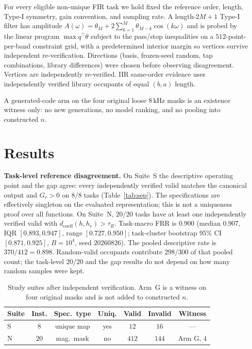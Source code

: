 \documentclass{article}
\begin{document}
For every eligible non-unique FIR task we hold fixed the reference
order, length, Type-I symmetry, gain convention, and sampling rate.
A length-$2M+1$ Type-I filter has amplitude
$A(\omega)=\theta_M+2\sum_{k=1}^{M}\theta_{M-k}\cos(k\omega)$
and is probed by the linear program
$\max q^\top\theta$ subject to the pass/stop inequalities on a
$512$-point-per-band constraint grid, with a predetermined interior
margin so vertices survive independent re-verification.
Directions (basis, frozen-seed random, tap combinations, library
differences) were chosen before observing disagreement.
Vertices are independently re-verified.
IIR same-order evidence uses independently verified library
occupants of equal $(b,a)$ length.

A generated-code arm on the four original loose $8\,\mathrm{kHz}$
masks is an existence witness only: no new generations, no model
ranking, and no pooling into constructed $n$.

\section{Results}
\label{sec:results}

\noindent\textbf{Task-level reference disagreement.}
On Suite~S the descriptive operating point and the gap agree: every
independently verified valid matches the canonical output and
$G_r>0$ on $8/8$ tasks (Table~\ref{tab:sep}).
The specifications are effectively singleton on the evaluated
representation; this is not a uniqueness proof over all functions.
On Suite~N, $20/20$ tasks have at least one independently verified
valid with $d_{\mathrm{coeff}}(h,h_r)>\tau_R$.
Task-macro FRR is $0.900$ (median $0.907$, IQR $[0.893,0.947]$,
range $[0.727,0.950]$; task-cluster bootstrap $95\%$ CI
$[0.871,0.925]$, $B=10^4$, seed $20260826$).
The pooled descriptive rate is $370/412=0.898$.
Random-valid occupants contribute $298/300$ of that pooled count;
the task-level $20/20$ and the gap results do not depend on how many
random samples were kept.

\begin{table}[t]
\caption{Study suites after independent verification.
Arm~G is a witness on four original masks and is not added to
constructed $n$.}
\label{tab:suite}
\centering
\footnotesize
\setlength{\tabcolsep}{2.6pt}
\begin{tabular}{@{}lcccccc@{}}
\hline
Suite & Inst. & Spec.\ type & Uniq. & Valid & Invalid & Witness \\
\hline
S & $8$ & unique map & yes & $12$ & $16$ & --- \\
N & $20$ & mag.\ mask & no & $412$ & $144$ & Arm G, $4$ \\
\hline
\end{tabular}
\end{table}
\end{document}
